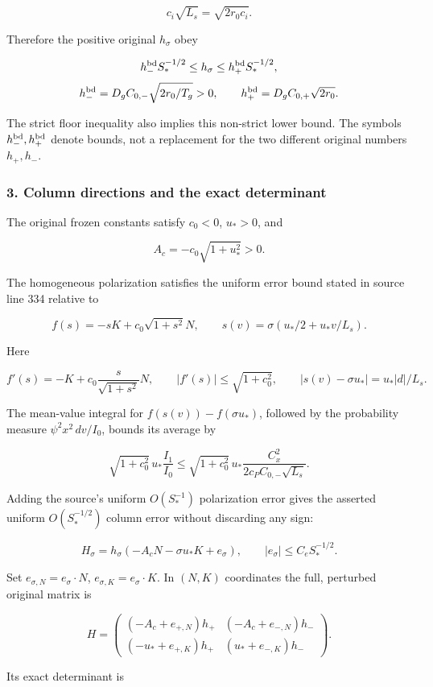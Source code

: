 \documentclass[10pt,a4paper]{article}
\begin{document}
\[
c_i\sqrt{L_s}=\sqrt{2r_0c_i}.
\]

Therefore the positive original \(h_\sigma\) obey

\[
h_-^{\rm bd}S_*^{-1/2}\le h_\sigma\le h_+^{\rm bd}S_*^{-1/2},
\] \[
h_-^{\rm bd}=D_gC_{0,-}\sqrt{2r_0/T_g}>0,
\qquad h_+^{\rm bd}=D_gC_{0,+}\sqrt{2r_0}.
\]

The strict floor inequality also implies this non-strict lower bound. The symbols \(h_-^{\rm bd},h_+^{\rm bd}\) denote bounds, not a replacement for the two different original numbers \(h_+,h_-\).

\subsubsection{3. Column directions and the exact determinant}

The original frozen constants satisfy \(c_0<0\), \(u_*>0\), and

\[
A_c=-c_0\sqrt{1+u_*^2}>0.
\]

The homogeneous polarization satisfies the uniform error bound stated in source line 334 relative to

\[
f(s)=-sK+c_0\sqrt{1+s^2}N,
\qquad s(v)=\sigma(u_*/2+u_*v/L_s).
\]

Here

\[
f'(s)=-K+c_0\frac{s}{\sqrt{1+s^2}}N,
\qquad |f'(s)|\le\sqrt{1+c_0^2},
\qquad |s(v)-\sigma u_*|=u_*|d|/L_s.
\]

The mean-value integral for \(f(s(v))-f(\sigma u_*)\), followed by the probability measure \(\psi^2x^2\,dv/I_0\), bounds its average by

\[
\sqrt{1+c_0^2}\,u_*\frac{I_1}{I_0}
\le \sqrt{1+c_0^2}\,u_*\frac{C_x^2}{2c_PC_{0,-}\sqrt{L_s}}.
\]

Adding the source's uniform \(O(S_*^{-1})\) polarization error gives the asserted uniform \(O(S_*^{-1/2})\) column error without discarding any sign:

\[
H_\sigma=h_\sigma(-A_cN-\sigma u_*K+e_\sigma),
\qquad |e_\sigma|\le C_eS_*^{-1/2}.
\]

Set \(e_{\sigma,N}=e_\sigma\cdot N\), \(e_{\sigma,K}=e_\sigma\cdot K\). In \((N,K)\) coordinates the full, perturbed original matrix is

\[
H=\begin{pmatrix}
(-A_c+e_{+,N})h_+&(-A_c+e_{-,N})h_-\\
(-u_*+e_{+,K})h_+&(u_*+e_{-,K})h_-
\end{pmatrix}.
\]

Its exact determinant is
\end{document}
